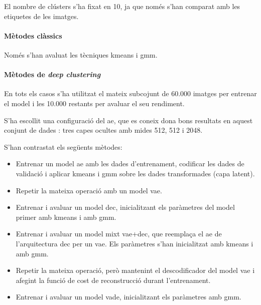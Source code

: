 \documentclass[CAT,BIB]{TFUOC}%
\begin{document}
            El nombre de clústers s'ha fixat en 10,
            ja que només s'han comparat amb les etiquetes de les imatges.

            \paragraph{Mètodes clàssics}
                Només s'han avaluat les tècniques \gls{kmeans} i \gls{gmm}.

            \paragraph{Mètodes de \textit{deep clustering}}
                En tots els casos s'ha utilitzat
                el mateix subcojunt de 60.000 imatges per entrenar el model
                i les 10.000 restants per avaluar el seu rendiment.

                S'ha escollit una configuració del \gls{ae},
                que es coneix dona bons resultats en aquest conjunt de dades \citep{Xie2015}:
                tres capes ocultes amb mides 512, 512 i 2048.

                S'han contrastat els següents mètodes:

                \begin{itemize}
                    \item Entrenar un model \gls{ae} amb les dades d'entrenament,
                    codificar les dades de validació
                    i aplicar \gls{kmeans} i \gls{gmm}
                    sobre les dades transformades (capa latent).

                    \item Repetir la mateixa operació amb un model \gls{vae}.

                    \item Entrenar i avaluar un model \gls{dec},
                    inicialitzant els paràmetres del model
                    primer amb \gls{kmeans} i amb \gls{gmm}.

                    \item Entrenar i avaluar un model mixt \gls{vae}+\gls{dec},
                    que reemplaça el \gls{ae} de l'arquitectura \gls{dec}
                    per un \gls{vae}.
                    Els paràmetres s'han inicialitzat amb \gls{kmeans} i amb \gls{gmm}.

                    \item Repetir la mateixa operació,
                    però mantenint el descodificador del model \gls{vae}
                    i afegint la funció de cost de reconstrucció
                    durant l'entrenament.

                    \item Entrenar i avaluar un model \gls{vade},
                    inicialitzant els paràmetres amb \gls{gmm}.
                \end{itemize}
\end{document}
